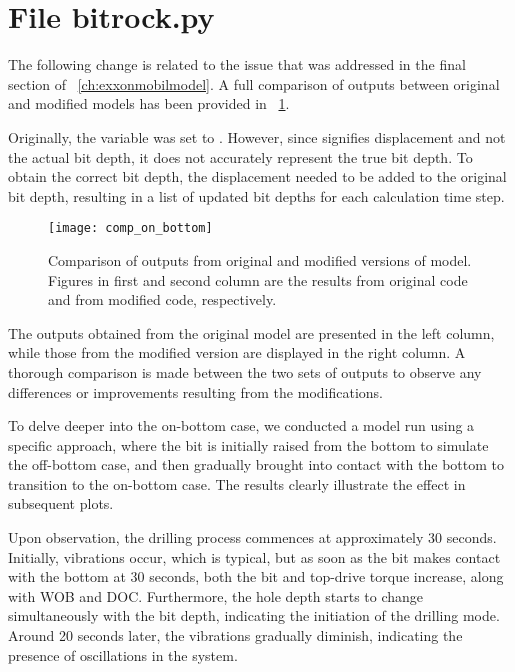 \section{File {\codefont bitrock.py}}
The following change is related to the issue that was addressed in the final section of \chaptername~\ref{ch:exxonmobilmodel}.
A full comparison of outputs between original and modified models has been provided in \figurename~\ref{Comaprison_on_bottom}.
\begin{codemodifications}

\begin{codemodification}{29}
Originally, the variable  was set to . However, since  signifies displacement and not the actual bit depth, it does not accurately represent the true bit depth. To obtain the correct bit depth, the displacement needed to be added to the original bit depth, resulting in a list of updated bit depths for each calculation time step.
\end{codemodification}

\end{codemodifications} 

\begin{figure}
  \centering
  \texttt{[image: comp\_on\_bottom]}
  \caption[Output comparison]{Comparison of outputs from original and modified versions of model. Figures in first and second column are the results from original code and from modified code, respectively.}\label{Comaprison_on_bottom}
\end{figure}

The outputs obtained from the original model are presented in the left column, while those from the modified version are displayed in the right column. A thorough comparison is made between the two sets of outputs to observe any differences or improvements resulting from the modifications. 

To delve deeper into the on-bottom case, we conducted a model run using a specific approach, where the bit is initially raised from the bottom to simulate the off-bottom case, and then gradually brought into contact with the bottom to transition to the on-bottom case. The results clearly illustrate the effect in subsequent plots.

Upon observation, the drilling process commences at approximately 30 seconds. Initially, vibrations occur, which is typical, but as soon as the bit makes contact with the bottom at 30 seconds, both the bit and top-drive torque increase, along with WOB and DOC. Furthermore, the hole depth starts to change simultaneously with the bit depth, indicating the initiation of the drilling mode. Around 20 seconds later, the vibrations gradually diminish, indicating the presence of oscillations in the system.
